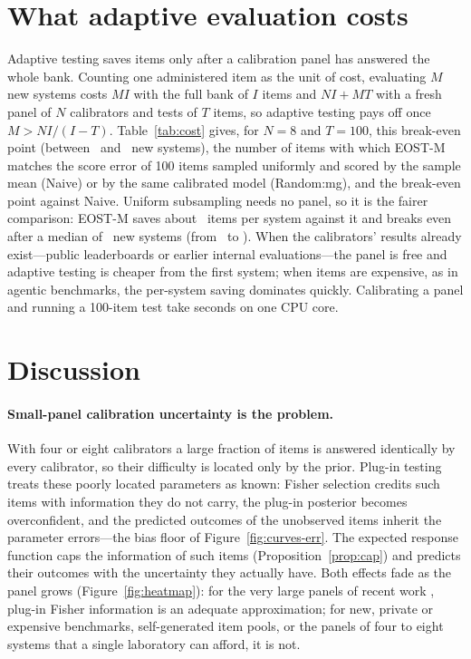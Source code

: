 \section{What adaptive evaluation costs}
\label{sec:cost}

Adaptive testing saves items only after a calibration panel has answered the whole bank.
Counting one administered item as the unit of cost, evaluating $M$ new systems costs $MI$
with the full bank of $I$ items and $NI+MT$ with a fresh panel of $N$ calibrators and tests of
$T$ items, so adaptive testing pays off once $M>NI/(I-T)$. Table~\ref{tab:cost} gives, for
$N=8$ and $T=100$, this break-even point (between \CostBreakFullMin\ and \CostBreakFullMax\
new systems), the number of items with which EOST-M matches the score error of 100 items
sampled uniformly and scored by the sample mean (Naive) or by the same calibrated model
(Random:mg), and the break-even point against Naive. Uniform subsampling needs no panel, so
it is the fairer comparison: EOST-M saves about \CostSaveNaive\ items per system against it
and breaks even after a median of \CostBreakNaiveMed\ new systems (from \CostBreakNaiveMin\
to \CostBreakNaiveMax). When the calibrators' results already exist---public leaderboards or
earlier internal evaluations---the panel is free and adaptive testing is cheaper from the
first system; when items are expensive, as in agentic benchmarks, the per-system saving
dominates quickly. Calibrating a panel and running a 100-item test take seconds on one CPU
core.



\section{Discussion}
\label{sec:discussion}

\paragraph{Small-panel calibration uncertainty is the problem.} With four or eight
calibrators a large fraction of items is answered identically by every calibrator, so their
difficulty is located only by the prior. Plug-in testing treats these
poorly located parameters as known: Fisher selection credits such items with information
they do not carry, the plug-in posterior becomes overconfident, and the predicted outcomes of
the unobserved items inherit the parameter errors---the bias floor of
Figure~\ref{fig:curves-err}. The expected response function caps the information of such
items (Proposition~\ref{prop:cap}) and predicts their outcomes with the uncertainty they
actually have. Both effects fade as the panel grows (Figure~\ref{fig:heatmap}): for the very
large panels of recent work \citep{li2026atlas}, plug-in Fisher information is an adequate
approximation; for new, private or expensive benchmarks, self-generated item pools, or the
panels of four to eight systems that a single laboratory can afford, it is not.

